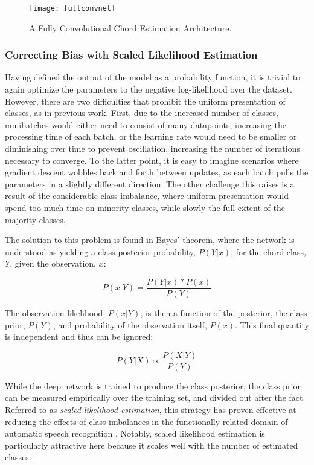 \begin{figure}[!t]
\centering
\texttt{[image: fullconvnet]}
\caption{A Fully Convolutional Chord Estimation Architecture.}
\label{fig:fullconvnet}
\end{figure}



\subsubsection{Correcting Bias with Scaled Likelihood Estimation}
\label{subsubsec:scaled_likelihood_estimation}
Having defined the output of the model as a probability function, it is trivial to again optimize the parameters to the negative log-likelihood over the dataset.
However, there are two difficulties that prohibit the uniform presentation of classes, as in previous work.
First, due to the increased number of classes, minibatches would either need to consist of many datapoints, increasing the processing time of each batch, or the learning rate would need to be smaller or diminishing over time to prevent oscillation, increasing the number of iterations necessary to converge.
To the latter point, it is easy to imagine scenarios where gradient descent wobbles back and forth between updates, as each batch pulls the parameters in a slightly different direction.
The other challenge this raises is a result of the considerable class imbalance, where uniform presentation would spend too much time on minority classes, while slowly the full extent of the majority classes.

The solution to this problem is found in Bayes' theorem, where the network is understood as yielding a class posterior probability, $P(Y|x)$, for the chord class, $Y$, given the observation, $x$:

\begin{equation}
P(x|Y) = \frac{P(Y|x)*P(x)}{P(Y)}
\end{equation}

The observation likelihood, $P(x|Y)$, is then a function of the posterior, the class prior, $P(Y)$, and probability of the observation itself, $P(x)$.
This final quantity is independent and thus can be ignored:

\begin{equation}
P(Y|X) \varpropto \frac{P(X|Y)}{P(Y)}
\end{equation}

While the deep network is trained to produce the class posterior, the class prior can be measured empirically over the training set, and divided out after the fact.
Referred to as \emph{scaled likelihood estimation}, this strategy has proven effective at reducing the effects of class imbalances in the functionally related domain of automatic speech recognition \cite{Deng, others}.
Notably, scaled likelihood estimation is particularly attractive here because it scales well with the number of estimated classes.

